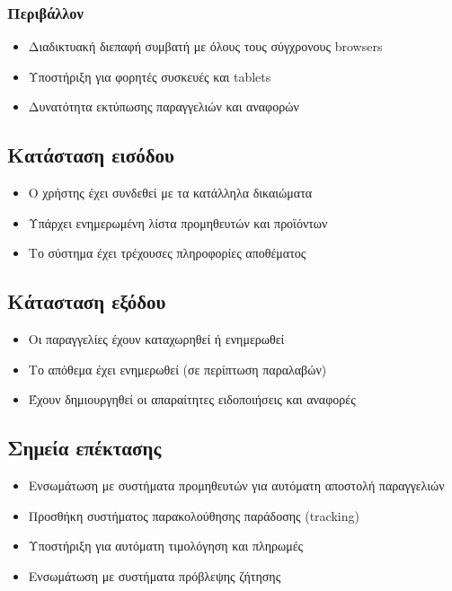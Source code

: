 \documentclass[12pt,a4paper,twoside]{book}
\begin{document}
\subsubsection{Περιβάλλον}
\begin{itemize}
  \item Διαδικτυακή διεπαφή συμβατή με όλους τους σύγχρονους browsers
  \item Υποστήριξη για φορητές συσκευές και tablets
  \item Δυνατότητα εκτύπωσης παραγγελιών και αναφορών
\end{itemize}

\subsection{Κατάσταση εισόδου}
\begin{itemize}
  \item Ο χρήστης έχει συνδεθεί με τα κατάλληλα δικαιώματα
  \item Υπάρχει ενημερωμένη λίστα προμηθευτών και προϊόντων
  \item Το σύστημα έχει τρέχουσες πληροφορίες αποθέματος
\end{itemize}

\subsection{Κάτασταση εξόδου}
\begin{itemize}
  \item Οι παραγγελίες έχουν καταχωρηθεί ή ενημερωθεί
  \item Το απόθεμα έχει ενημερωθεί (σε περίπτωση παραλαβών)
  \item Έχουν δημιουργηθεί οι απαραίτητες ειδοποιήσεις και αναφορές
\end{itemize}

\subsection{Σημεία επέκτασης}
\begin{itemize}
  \item Ενσωμάτωση με συστήματα προμηθευτών για αυτόματη αποστολή παραγγελιών
  \item Προσθήκη συστήματος παρακολούθησης παράδοσης (tracking)
  \item Υποστήριξη για αυτόματη τιμολόγηση και πληρωμές
  \item Ενσωμάτωση με συστήματα πρόβλεψης ζήτησης
\end{itemize}
\end{document}
